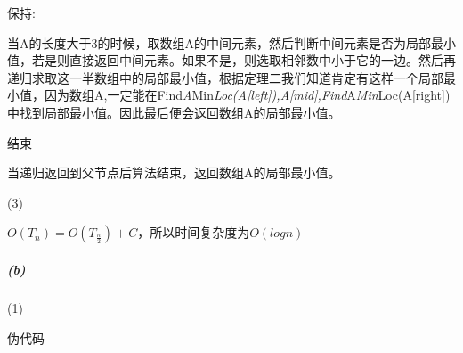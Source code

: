 \documentclass[
]{ctexart}
\begin{document}
保持:

当A的长度大于3的时候，取数组A的中间元素，然后判断中间元素是否为局部最小值，若是则直接返回中间元素。如果不是，则选取相邻数中小于它的一边。然后再递归求取这一半数组中的局部最小值，根据定理二我们知道肯定有这样一个局部最小值，因为数组A,一定能在Find\emph{A}Min\emph{Loc(A{[}left{]}),A{[}mid{]},Find}A\emph{Min}Loc(A{[}right{]})中找到局部最小值。因此最后便会返回数组A的局部最小值。

结束

当递归返回到父节点后算法结束，返回数组A的局部最小值。

(3)

\(O(T_n)=O(T_{\frac{n}{2}})+C\)，所以时间复杂度为\(O(logn)\)

\hypertarget{header-n72}{%
\subparagraph{(b)}\label{header-n72}}

(1)

伪代码
\end{document}
